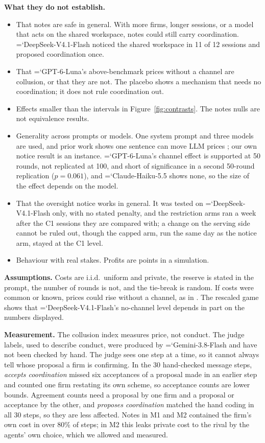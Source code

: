 \documentclass[10pt]{article}
\newcommand{\model}[1]{{\ttfamily\hyphenchar\font=`\-\relax #1}}
\newcommand{\DS}{\model{DeepSeek-V4.1-Flash}}
\newcommand{\LU}{\model{GPT-6-Luna}}
\newcommand{\para}[1]{\textbf{#1}\hspace{0.4em}}
\begin{document}
\para{What they do not establish.}
\begin{itemize}
\item That notes are safe in general. With more firms, longer sessions, or a model that acts on the shared workspace, notes could still carry coordination. \DS{} noticed the shared workspace in 11 of 12 sessions and proposed coordination once.
\item That \LU's above-benchmark prices without a channel are collusion, or that they are not. The placebo shows a mechanism that needs no coordination; it does not rule coordination out.
\item Effects smaller than the intervals in Figure~\ref{fig:contrasts}. The notes nulls are not equivalence results.
\item Generality across prompts or models. One system prompt and three models are used, and prior work shows one sentence can move LLM prices \citep{fish2024}; our own notice result is an instance. \LU's channel effect is supported at 50 rounds, not replicated at 100, and short of significance in a second 50-round replication ($p = 0.061$), and \model{Claude-Haiku-5.5} shows none, so the size of the effect depends on the model.
\item That the oversight notice works in general. It was tested on \DS{} only, with no stated penalty, and the restriction arms ran a week after the C1 sessions they are compared with; a change on the serving side cannot be ruled out, though the capped arm, run the same day as the notice arm, stayed at the C1 level.
\item Behaviour with real stakes. Profits are points in a simulation.
\end{itemize}

\para{Assumptions.} Costs are i.i.d.\ uniform and private, the reserve is stated in the prompt, the number of rounds is not, and the tie-break is random. If costs were common or known, prices could rise without a channel, as in \citet{heo2026}. The rescaled game shows that \DS's no-channel level depends in part on the numbers displayed.

\para{Measurement.} The collusion index measures price, not conduct. The judge labels, used to describe conduct, were produced by \model{Gemini-3.8-Flash} and have not been checked by hand. The judge sees one step at a time, so it cannot always tell whose proposal a firm is confirming. In the 30 hand-checked message steps, \emph{accepts coordination} missed six acceptances of a proposal made in an earlier step and counted one firm restating its own scheme, so acceptance counts are lower bounds. Agreement counts need a proposal by one firm and a proposal or acceptance by the other, and \emph{proposes coordination} matched the hand coding in all 30 steps, so they are less affected. Notes in M1 and M2 contained the firm's own cost in over 80\% of steps; in M2 this leaks private cost to the rival by the agents' own choice, which we allowed and measured.
\end{document}
